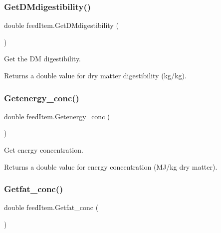 \subsubsection{\texorpdfstring{GetDMdigestibility()}{GetDMdigestibility()}}
{\footnotesize\ttfamily double feed\+Item.\+Get\+D\+Mdigestibility (\begin{DoxyParamCaption}{ }\end{DoxyParamCaption})\hspace{0.3cm}{\ttfamily [inline]}}



Get the DM digestibility. 

\begin{DoxyReturn}{Returns}
a double value for dry matter digestibility (kg/kg). 
\end{DoxyReturn}
\mbox{\label{classfeed_item_ada32a85ac5816c09adeca9e757e666e8}} 
\subsubsection{\texorpdfstring{Getenergy\_conc()}{Getenergy\_conc()}}
{\footnotesize\ttfamily double feed\+Item.\+Getenergy\+\_\+conc (\begin{DoxyParamCaption}{ }\end{DoxyParamCaption})\hspace{0.3cm}{\ttfamily [inline]}}



Get energy concentration. 

\begin{DoxyReturn}{Returns}
a double value for energy concentration (M\+J/kg dry matter). 
\end{DoxyReturn}
\mbox{\label{classfeed_item_a691bb377b814d94f806918e8572ad59f}} 
\subsubsection{\texorpdfstring{Getfat\_conc()}{Getfat\_conc()}}
{\footnotesize\ttfamily double feed\+Item.\+Getfat\+\_\+conc (\begin{DoxyParamCaption}{ }\end{DoxyParamCaption})\hspace{0.3cm}{\ttfamily [inline]}}



